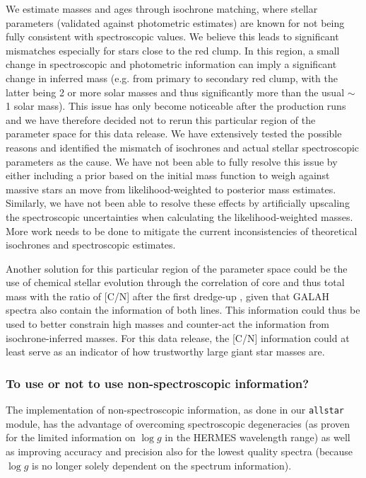 \documentclass[
  journal=pasa,
  manuscript=research-paper, %
  year=2024,
  volume=37
]{cup-journal}
\newcommand{\logg}{$\log g$\xspace}
\begin{document}
We estimate masses and ages through isochrone matching, where stellar parameters (validated against photometric estimates) are known for not being fully consistent with spectroscopic values.
We believe this leads to significant mismatches especially for stars close to the red clump. In this region, a small change in spectroscopic and photometric information can imply a significant change in inferred mass (e.g. from primary to secondary red clump, with the latter being 2 or more solar masses and thus significantly more than the usual $\sim$ 1 solar mass). This issue has only become noticeable after the production runs and we have therefore decided not to rerun this particular region of the parameter space for this data release. We have extensively tested the possible reasons and identified the mismatch of isochrones and actual stellar spectroscopic parameters as the cause. We have not been able to fully resolve this issue by either including a prior based on the initial mass function to weigh against massive stars \citep[see e.g.][]{Sharma2018} an move from likelihood-weighted to posterior mass estimates. Similarly, we have not been able to resolve these effects by artificially upscaling the spectroscopic uncertainties when calculating the likelihood-weighted masses. More work needs to be done to mitigate the current inconsistencies of theoretical isochrones and spectroscopic estimates.

Another solution for this particular region of the parameter space could be the use of chemical stellar evolution through the correlation of core and thus total mass with the ratio of [C/N] after the first dredge-up \citep{Masseron2015, Martig2016}, given that GALAH spectra also contain the information of both lines. This information could thus be used to better constrain high masses and counter-act the information from isochrone-inferred masses. For this data release, the [C/N] information could at least serve as an indicator of how trustworthy large giant star masses are.

\subsubsection{To use or not to use non-spectroscopic information?}

The implementation of non-spectroscopic information, as done in our \texttt{allstar} module, has the advantage of overcoming spectroscopic degeneracies (as proven for the limited information on \logg in the HERMES wavelength range) as well as improving accuracy and precision also for the lowest quality spectra (because \logg is no longer solely dependent on the spectrum information).
\end{document}
